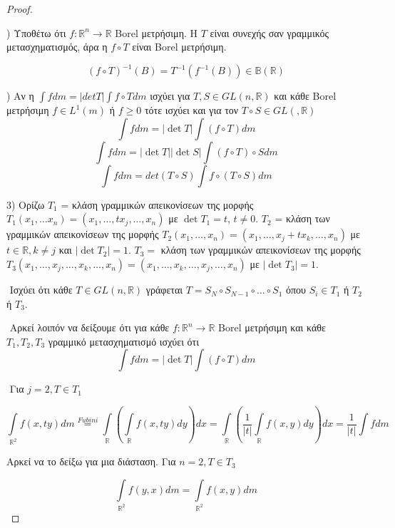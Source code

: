 \begin{proof} $ $

    $ $) Υποθέτω ότι $f: \mathbb R^n \rightarrow \mathbb R$ {\eng Borel} μετρήσιμη. Η $T$ είναι συνεχής σαν γραμμικός μετασχηματισμός, άρα η $f\circ T$ είναι {\eng Borel} μετρήσιμη.

    $$(f\circ T)^{-1}(B) = T^{-1}\left( f^{-1}(B)\right) \in \mathbb B (\mathbb{R})$$
    
    $ $) Αν η $\int f dm = |detT| \int f\circ T dm$ ισχύει για $T,S \in GL(n,\mathbb R)$ και κάθε {\eng Borel} μετρήσιμη $f \in L^1 (m)$ ή $f\geq 0$ τότε ισχύει και για τον $T\circ S \in GL(,\mathbb R)$
    $$\int f dm = |\det T| \int (f\circ T) dm$$
    $$\int f dm = |\det T||\det S| \int (f\circ T) \circ S dm$$
    $$\int f dm = det(T\circ S) \int f\circ(T\circ S)dm$$

    3) Ορίζω $T_1$ = κλάση γραμμικών απεικονίσεων της μορφής $T_1(x_1,\ldots x_n) = (x_1,\ldots, tx_j,\ldots ,x_n)$ με $\det T_1 = t$, $t\neq 0$. $T_2$ = κλάση των γραμμικών απεικονίσεων της μορφής $T_2(x_1,\ldots,x_n) = (x_1,\ldots,x_j +tx_k,\ldots,x_n)$ με $t \in \mathbb R, k\neq j$ και $|\det T_2| = 1$. $T_3 = $ κλάση των γραμμικών απεικονίσεων της μορφής $T_3 (x_1,\ldots,x_j,\ldots,x_k,\ldots,x_n) = (x_1,\ldots,x_k,\ldots,x_j,\ldots,x_n)$ με $|\det T_3| = 1$.

    $ $\newline
    Ισχύει ότι κάθε $T \in GL(n,\mathbb R)$ γράφεται $T=S_N \circ S_{N-1} \circ \ldots \circ S_1$ όπου $S_i \in T_1$ ή $T_2$ ή $T_3$.

    $ $\newline
    Αρκεί λοιπόν να δείξουμε ότι για κάθε $f: \mathbb R^n \rightarrow \mathbb R$ {\eng Borel} μετρήσιμη και κάθε $T_1,T_2,T_3$ γραμμικό μετασχηματισμό ισχύει ότι
    $$\int f dm = |\det T| \int (f\circ T)dm$$

    $ $\newline
    Για $j=2, T \in T_1$

    $$ \int\limits_{\mathbb R^2} f(x,ty) dm \overset{ Fubini }{=} \int\limits_{\mathbb R}\left( \int\limits_{\mathbb{R}} f(x,ty) dy\right)dx = \int\limits_{\mathbb{R}} \left( \frac{1}{|t|} \int\limits_{\mathbb{R}} f(x,y)dy\right) dx = \frac{1}{|t|} \int fdm $$

    Αρκεί να το δείξω για μια διάσταση. Για $n=2, T\in T_3$

    $$\int\limits_{\mathbb R^2} f(y,x) dm = \int\limits_{\mathbb R^2} f(x,y)dm$$


\end{proof}
